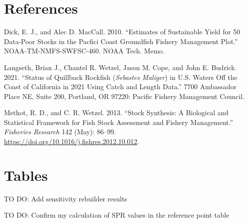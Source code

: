 \documentclass[11pt,
  english,
  a4paper,
]{article}
\begin{document}

\hypertarget{references}{%
\section{References}\label{references}}

\leavevmode\tagmcend\tagstructend


\hypertarget{refs}{}
\leavevmode\hypertarget{ref-DickandMacCall_dbsra_2010}{}%
Dick, E. J., and Alec D. MacCall. 2010. ``Estimates of Sustainable Yield for 50 Data-Poor Stocks in the Pacfici Coast Groundfish Fishery Management Plot.'' NOAA-TM-NMFS-SWFSC-460. NOAA Tech. Memo.

\leavevmode\hypertarget{ref-Langseth_status_2021}{}%
Langseth, Brian J., Chantel R. Wetzel, Jason M. Cope, and John E. Budrick. 2021. ``Status of Quillback Rockfish (\emph{Sebastes Maliger}) in U.S. Waters Off the Coast of California in 2021 Using Catch and Length Data.'' 7700 Ambassador Place NE, Suite 200, Portland, OR 97220: Pacific Fishery Management Council.

\leavevmode\hypertarget{ref-methot_stock_2013}{}%
Methot, R. D., and C. R. Wetzel. 2013. ``Stock Synthesis: A Biological and Statistical Framework for Fish Stock Assessment and Fishery Management.'' \emph{Fisheries Research} 142 (May): 86--99. \url{https://doi.org/10.1016/j.fishres.2012.10.012}.

\leavevmode\tagmcend\tagstructend

\clearpage


\hypertarget{tables}{%
\section{Tables}\label{tables}}

\leavevmode\tagmcend\tagstructend


TO DO: Add sensitivity rebuilder results

\leavevmode\tagmcend\tagstructend\par


TO DO: Confirm my calculation of SPR values in the reference point table
\end{document}
